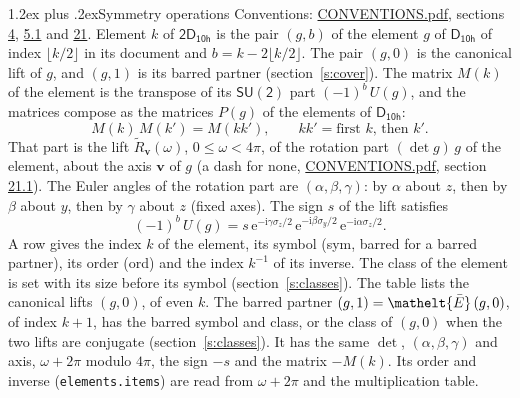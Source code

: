 \documentclass[10pt,a4paper]{article}
\makeatletter
\renewcommand\section{\@startsection{section}{1}{\z@}{-3ex plus -1ex minus -.2ex}%
  {1.2ex plus .2ex}{\normalfont\large\sffamily\bfseries\color{parttitle}}}
\numberwithin{equation}{section}
\newcommand{\eltfont}[1]{{\let\sigma\eltsigma\mathelt{#1}}}
\newcommand{\grp}[1]{\mathsf{#1}}
\newcommand{\elt}[1]{\eltfont{#1}}
\newcommand{\vv}{\mathbf{v}}
\newcommand{\iunit}{\mathrm{i}}
\newcommand{\expe}{\mathrm{e}}
\newcommand{\barred}[1]{\bar{#1}}
\newcommand{\lift}[1]{\tilde{#1}}
\newcommand{\pauli}[1]{\sigma_{#1}}
\makeatother
\begin{document}
\section{Symmetry operations}\label{s:elements}
Conventions: \href{../../CONVENTIONS.pdf}{CONVENTIONS.pdf}, sections \href{../../../rotation/CONVENTIONS.pdf\#conv.4}{4}, \href{../../../rotation/CONVENTIONS.pdf\#conv.5.1}{5.1} and \href{../../CONVENTIONS.pdf\#conv.21}{21}.
\leavevmode\label{n:index.element}\label{n:element.g}Element $k$ of $\grp{2D_{10h}}$ is the pair $(g, b)$ of the element $g$ of \href{../../../rotation/data/pdf/D10h.pdf}{$\grp{D_{10h}}$} of index $\lfloor k/2\rfloor$ in its document and $b = k - 2\lfloor k/2\rfloor$. The pair $(g, 0)$ is the canonical lift of $g$, and $(g, 1)$ is its barred partner (section~\ref{s:cover}). \label{n:matrix.element.pin}\label{n:matrix.element}The matrix $M(k)$ of the element is the transpose of its $\grp{SU(2)}$ part $(-1)^{b}\,U(g)$, and the matrices compose as the matrices $P(g)$ of the elements of $\grp{D_{10h}}$:
\begin{equation}\label{e:mprod}M(k)\,M(k') = M(kk'),\qquad kk' = \text{first } k\text{, then } k'.\end{equation}
\leavevmode\label{n:angle.omega}\label{n:vector.axis}\label{n:vector.pole}That part is the lift $\lift{R}_{\vv}(\omega)$, $0 \le \omega < 4\pi$, of the rotation part $(\det g)\,g$ of the element, about the axis $\vv$ of $g$ (a dash for none, \href{../../CONVENTIONS.pdf}{CONVENTIONS.pdf}, section \href{../../CONVENTIONS.pdf\#conv.21.1}{21.1}). \label{n:angle.euler.alpha}\label{n:angle.euler.beta}\label{n:angle.euler.gamma}\label{n:vector.coordinates}The Euler angles of the rotation part are $(\alpha,\beta,\gamma)$: by $\alpha$ about $z$, then by $\beta$ about $y$, then by $\gamma$ about $z$ (fixed axes). \label{n:local.euler.sign}The sign $s$ of the lift satisfies
\begin{equation}\label{e:euler}(-1)^{b}\,U(g) = s\,\expe^{-\iunit\gamma\pauli{z}/2}\,\expe^{-\iunit\beta\pauli{y}/2}\,\expe^{-\iunit\alpha\pauli{z}/2}.\end{equation}
\leavevmode\label{n:index.element.inverse}\label{n:head.sym}\label{n:head.ord}A row gives the index $k$ of the element, its symbol (sym, barred for a barred partner), its order (ord) and the index $k^{-1}$ of its inverse. \label{n:head.class}The class of the element is set with its size before its symbol (section~\ref{s:classes}).
The table lists the canonical lifts $(g, 0)$, of even $k$. The barred partner $(g, 1) = \elt{\barred{E}}\,(g, 0)$, of index $k + 1$, has the barred symbol and class, or the class of $(g, 0)$ when the two lifts are conjugate (section~\ref{s:classes}). It has the same $\det$, $(\alpha,\beta,\gamma)$ and axis, $\omega + 2\pi$ modulo $4\pi$, the sign $-s$ and the matrix $-M(k)$. Its order and inverse (\texttt{elements.items}) are read from $\omega + 2\pi$ and the multiplication table.
\end{document}
